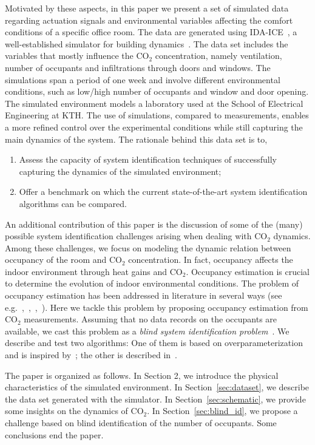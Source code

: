 \documentclass{article}
\begin{document}
Motivated by these aspects, in this paper we present a set of simulated data
regarding actuation signals and environmental variables affecting the comfort
conditions of a specific office room. The data are generated using
IDA-ICE~\citeauthor{equa2015equa}, a well-established simulator for building
dynamics~\cite{crawley2008contrasting}. The data set includes the
variables that mostly influence the CO$_2$ concentration, namely
ventilation, number of occupants and infiltrations through doors and windows. The
simulations span a period of one week and involve different environmental
conditions, such as low/high number of occupants and window and door opening.
The simulated environment models a laboratory used at the School of Electrical
Engineering at KTH\@. The use of simulations, compared to measurements, enables a
more refined control over the experimental conditions while still capturing the
main dynamics of the system. The rationale behind this data set is to,
\begin{enumerate}
  \item Assess the capacity of system identification techniques of successfully
    capturing the dynamics of the simulated environment;
  \item Offer a benchmark on
    which the current state-of-the-art system identification algorithms can be
    compared.
\end{enumerate}

An additional contribution of this paper is the discussion of some of the
(many) possible system identification challenges arising when dealing with
CO$_2$ dynamics. Among these challenges, we focus on modeling the dynamic
relation between occupancy of the room and CO$_2$ concentration.
In fact, occupancy affects the indoor environment through heat gains and
CO$_2$. Occupancy estimation is crucial to determine the evolution of indoor
environmental conditions. The problem of occupancy estimation has been
addressed in literature in several ways (see
e.g.~\cite{han2012occupancy},~\cite{liao2012agent},~\cite{ai2014occupancy},~\cite{ebadat2013estimation}).
Here we tackle this problem by proposing occupancy estimation from
CO$_2$ measurements. Assuming that no data records on the occupants are
available, we cast this problem as a \emph{blind system identification
problem}~\cite{abedmeraim1997blind}. We describe and
test two algorithms: One of them is based on overparameterization and is
inspired by~\cite{bai1998optimal}; the other is described in~\cite{bottegal2015blind}.

The paper is organized as follows. In Section 2, we introduce the
physical characteristics of the simulated environment. In Section~\ref{sec:dataset}, we describe the data set generated with the simulator. In
Section~\ref{sec:schematic}, we provide some insights on the dynamics of
CO$_2$. In Section~\ref{sec:blind_id}, we propose a challenge based on blind
identification of the number of occupants. Some conclusions end the paper.
\end{document}
